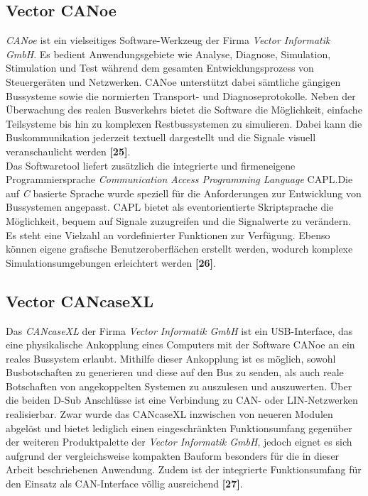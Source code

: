 \subsection{Vector CANoe} \label{subsec:CANoe}
\emph{CANoe} ist ein vielseitiges Software-Werkzeug der Firma \emph{Vector Informatik GmbH}. Es bedient Anwendungsgebiete wie Analyse, Diagnose, Simulation, Stimulation und Test während dem gesamten Entwicklungsprozess von Steuergeräten und Netzwerken. CANoe unterstützt dabei sämtliche gängigen Bussysteme sowie die normierten Transport- und Diagnoseprotokolle. Neben der Überwachung des realen Busverkehrs bietet die Software die Möglichkeit, einfache Teilsysteme bis hin zu komplexen Restbussystemen zu simulieren. Dabei kann die Buskommunikation jederzeit textuell dargestellt und die Signale visuell veranschaulicht werden \textbf{[25]}.\\
Das Softwaretool liefert zusätzlich die integrierte und firmeneigene Programmiersprache \emph{Communication Access Programming Language} \acs{CAPL}.Die auf \emph{C} basierte Sprache wurde speziell für die Anforderungen zur Entwicklung von Bussystemen angepasst. \acs{CAPL} bietet als eventorientierte Skriptsprache die Möglichkeit, bequem auf Signale zuzugreifen und die Signalwerte zu verändern. Es steht eine Vielzahl an vordefinierter Funktionen zur Verfügung. Ebenso können eigene grafische Benutzeroberflächen erstellt werden, wodurch komplexe Simulationsumgebungen erleichtert werden \textbf{[26]}.

\subsection{Vector CANcaseXL} \label{subsec.CANcaseXL}
Das \emph{CANcaseXL} der Firma \emph{Vector Informatik GmbH} ist ein USB-Interface, das eine physikalische Ankopplung eines Computers mit der Software CANoe an ein reales Bussystem erlaubt. Mithilfe dieser Ankopplung ist es möglich, sowohl Busbotschaften zu generieren und diese auf den Bus zu senden, als auch reale Botschaften von angekoppelten Systemen zu auszulesen und auszuwerten. Über die beiden D-Sub Anschlüsse ist eine Verbindung zu \acs{CAN}- oder LIN-Netzwerken realisierbar. Zwar wurde das CANcaseXL inzwischen von neueren Modulen abgelöst und bietet lediglich einen eingeschränkten Funktionsumfang gegenüber der weiteren Produktpalette der \emph{Vector Informatik GmbH}, jedoch eignet es sich aufgrund der vergleichsweise kompakten Bauform besonders für die in dieser Arbeit beschriebenen Anwendung. Zudem ist der integrierte Funktionsumfang für den Einsatz als \acs{CAN}-Interface völlig ausreichend \textbf{[27]}.




